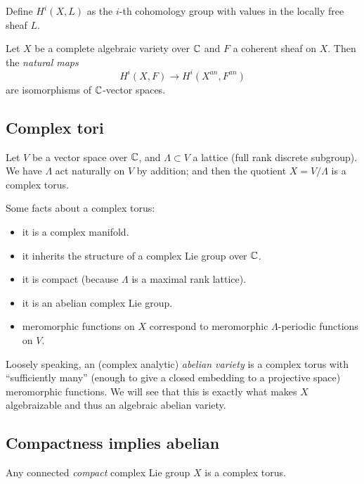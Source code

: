 Define $H^i(X,L)$ as the $i$-th cohomology group with values in the locally free sheaf $L$. 

\begin{theorem}[Serre]
Let $X$ be a complete algebraic variety over ${\mathbb C}$ and $F$ a coherent sheaf on $X$. Then the \emph{natural maps} 
$$H^i(X,F)\to H^i(X^{an},F^{an})$$
are isomorphisms of ${\mathbb C}$-vector spaces.
\end{theorem}

\subsection{Complex tori}
Let $V$ be a vector space over ${\mathbb C}$, and $\Lambda\subset V$ a lattice (full rank discrete subgroup). We have $\Lambda$ act naturally on $V$ by addition; and then the quotient $X=V/\Lambda$ is a complex torus. 

Some facts about a complex torus:
\begin{itemize}
\item it is a complex manifold.
\item it inherits the structure of a complex Lie group over ${\mathbb C}$.
\item it is compact (because $\Lambda$ is a maximal rank lattice).
\item it is an abelian complex Lie group.
\item meromorphic functions on $X$ correspond to meromorphic $\Lambda$-periodic functions on $V$. 
\end{itemize}

Loosely speaking, 
an (complex analytic) \emph{abelian variety} is a complex torus with ``sufficiently many'' (enough to give a closed embedding to a projective space) meromorphic functions. We will see that this is exactly what makes $X$ algebraizable and thus an algebraic abelian variety.

\subsection{Compactness implies abelian}

\begin{theorem}
Any connected \emph{compact} complex Lie group $X$ is a complex torus.
\end{theorem}

